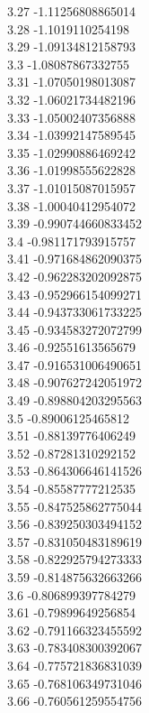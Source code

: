 {3.27	-1.11256808865014\\
3.28	-1.1019110254198\\
3.29	-1.09134812158793\\
3.3	-1.08087867332755\\
3.31	-1.07050198013087\\
3.32	-1.06021734482196\\
3.33	-1.05002407356888\\
3.34	-1.03992147589545\\
3.35	-1.02990886469242\\
3.36	-1.01998555622828\\
3.37	-1.01015087015957\\
3.38	-1.00040412954072\\
3.39	-0.990744660833452\\
3.4	-0.981171793915757\\
3.41	-0.971684862090375\\
3.42	-0.962283202092875\\
3.43	-0.952966154099271\\
3.44	-0.943733061733225\\
3.45	-0.934583272072799\\
3.46	-0.92551613565679\\
3.47	-0.916531006490651\\
3.48	-0.907627242051972\\
3.49	-0.898804203295563\\
3.5	-0.89006125465812\\
3.51	-0.88139776406249\\
3.52	-0.87281310292152\\
3.53	-0.864306646141526\\
3.54	-0.85587777212535\\
3.55	-0.847525862775044\\
3.56	-0.839250303494152\\
3.57	-0.831050483189619\\
3.58	-0.822925794273333\\
3.59	-0.814875632663266\\
3.6	-0.806899397784279\\
3.61	-0.79899649256854\\
3.62	-0.791166323455592\\
3.63	-0.783408300392067\\
3.64	-0.775721836831039\\
3.65	-0.768106349731046\\
3.66	-0.760561259554756\\
}
